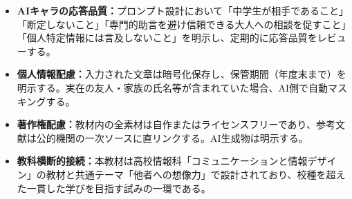 \documentclass[uplatex,a4paper,11pt]{jsarticle}
\begin{document}
\begin{itemize}[leftmargin=2em,itemsep=2pt,topsep=2pt]
    \begin{itemize}[leftmargin=1em,topsep=0pt,itemsep=0pt]
      \item 内閣府「人間中心のAI社会原則」（\texttt{https://www8.cao.go.jp/cstp/aigensoku.pdf}）
      \item 文部科学省「初等中等教育段階における生成AIの利用に関するガイドライン」
      \item 法務省「子どもの人権110番」（\texttt{https://www.moj.go.jp/JINKEN/jinken112.html}）
    \end{itemize}
  \item \textbf{AIキャラの応答品質：}プロンプト設計において「中学生が相手であること」「断定しないこと」「専門的助言を避け信頼できる大人への相談を促すこと」「個人特定情報には言及しないこと」を明示し、定期的に応答品質をレビューする。
  \item \textbf{個人情報配慮：}入力された文章は暗号化保存し、保管期間（年度末まで）を明示する。実在の友人・家族の氏名等が含まれていた場合、AI側で自動マスキングする。
  \item \textbf{著作権配慮：}教材内の全素材は自作またはライセンスフリーであり、参考文献は公的機関の一次ソースに直リンクする。AI生成物は明示する。
  \item \textbf{教科横断的接続：}本教材は高校情報科「コミュニケーションと情報デザイン」の教材と共通テーマ「他者への想像力」で設計されており、校種を超えた一貫した学びを目指す試みの一環である。
\end{itemize}
\end{document}
